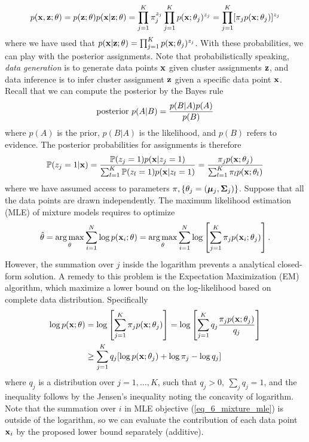 \documentclass[../main.tex]{subfiles}
\begin{document}
\begin{equation*}
p({\bf x,z};\theta) = p({\bf z};\theta)p({\bf x}|{\bf z};\theta) = \prod_{j=1}^{K}\pi_j^{z_j} \prod_{j=1}^{K}p({\bf x};\theta_j)^{z_j} = \prod_{j=1}^{K}[\pi_jp({\bf x};\theta_j)]^{z_j}
\end{equation*}
where we have used that $p({\bf x}|{\bf z};\theta) =\prod_{j=1}^{K}p({\bf x};\theta_j)^{z_j}$. With these probabilities, we can play with the posterior assignments. Note that probabilistically speaking, \emph{data generation} is to generate data points ${\bf x}$ given cluster assignments ${\bf z}$, and data inference is to infer cluster assignment ${\bf z}$ given a specific data point ${\bf x}$. Recall that we can compute the posterior by the Bayes rule
\begin{equation*}
{\rm posterior}\ p(A|B)=\frac{p(B|A)p(A)}{p(B)}
\end{equation*}
where $p(A)$ is the prior, $p(B|A)$ is the likelihood, and $p(B)$ refers to evidence. The posterior probabilities for assignments is therefore
\begin{equation*}
\mathbb{P}(z_j=1|{\bf x})=\frac{\mathbb{P}(z_j=1)p({\bf x}|z_j=1)}{\sum_{l=1}^{K}\mathbb{P}(z_l=1)p({\bf x}|z_l=1)}=\frac{\pi_jp({\bf x};\theta_j)}{\sum_{l=1}^{K}\pi_lp({\bf x};\theta_l)}
\end{equation*}
where we have assumed access to parameters $\pi, \{\theta_j=(\bm{\mu}_j,{\bf \Sigma}_j)\}$. Suppose that all the data points are drawn independently. The maximum likelihood estimation (MLE) of mixture models requires to optimize
\begin{equation}\label{eq_6_mixture_mle}
\hat{\theta} = \mathop{\arg\max}_{\theta} \sum_{i=1}^{N}\log p({\bf x}_i;\theta) = \mathop{\arg\max}_{\theta} \sum_{i=1}^{N}\log \left[\sum_{j=1}^{K} \pi_jp({\bf x}_i;\theta_j)\right].
\end{equation}
However, the summation over $j$ inside the logarithm prevents a analytical closed-form solution. A remedy to this problem is the Expectation Maximization (EM) algorithm, which maximize a lower bound on the log-likelihood based on complete data distribution. Specifically
\begin{align}
\log p({\bf x;\theta})&=\log \left[\sum_{j=1}^{K} \pi_jp({\bf x};\theta_j)\right]=\log \left[\sum_{j=1}^{K} q_j \frac{\pi_jp({\bf x};\theta_j)}{q_j} \right]\notag\\
\label{eq_6_em_bd}&\geq \sum_{j=1}^{K}q_j[\log p({\bf x};\theta_j) +\log \pi_j - \log q_j]
\end{align}
where $q_j$ is a distribution over $j=1,\dots,K$, such that $q_j>0,\ \sum_j q_j=1$, and the inequality follows by the Jensen's inequality noting the concavity of logarithm. Note that the summation over $i$ in MLE objective (\ref{eq_6_mixture_mle}) is outside of the logarithm, so we can evaluate the contribution of each data point ${\bf x}_i$ by the proposed lower bound separately (additive).
\end{document}
